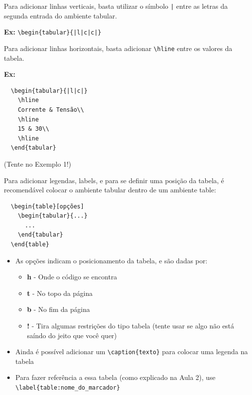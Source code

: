 \documentclass[12pt]{beamer}
\begin{document}
\begin{frame}[fragile]
  Para adicionar linhas verticais, basta utilizar o símbolo \verb+|+ entre as letras da segunda entrada do ambiente tabular.

  \textbf{Ex:} \verb+\begin{tabular}{|l|c|c|}+

  \medskip

  Para adicionar linhas horizontais, basta adicionar \verb+\hline+ entre os valores da tabela.

  \textbf{Ex:}
  \begin{verbatim}
  \begin{tabular}{|l|c|}
    \hline
    Corrente & Tensão\\
    \hline
    15 & 30\\
    \hline
  \end{tabular}
  \end{verbatim}
  (Tente no Exemplo 1!)
\end{frame}

\begin{frame}[fragile]
  Para adicionar legendas, labels, e para se definir uma posição da tabela, é recomendável colocar o ambiente tabular dentro de um ambiente table:
  \begin{verbatim}
  \begin{table}[opções]
    \begin{tabular}{...}
      ...
    \end{tabular}
  \end{table}
  \end{verbatim}
\end{frame}

\begin{frame}[fragile]
  \begin{itemize}
    \item As opções indicam o posicionamento da tabela, e são dadas por:
    \begin{itemize}
      \item \textbf{h} - Onde o código se encontra
      \item \textbf{t} - No topo da página
      \item \textbf{b} - No fim da página
      \item \textbf{!} - Tira algumas restrições do tipo tabela (tente usar se algo não está saíndo do jeito que você quer)
    \end{itemize}
    \item Ainda é possível adicionar um \verb+\caption{texto}+ para colocar uma legenda na tabela
    \item Para fazer referência a essa tabela (como explicado na Aula 2), use \verb+\label{table:nome_do_marcador}+
  \end{itemize}
\end{frame}
\end{document}
